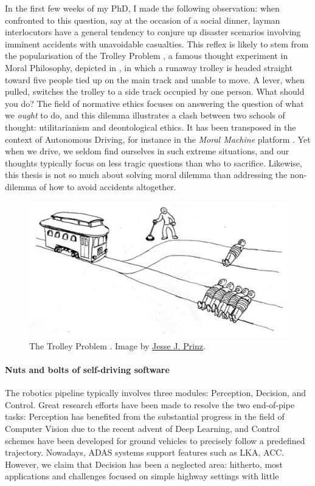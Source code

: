 In the first few weeks of my PhD, I made the following observation: when confronted to this question, say at the occasion of a social dinner, layman interlocutors have a general tendency to conjure up disaster scenarios involving imminent accidents with unavoidable casualties. 
This reflex is likely to stem from the popularisation of the Trolley Problem \citep{Foot1967}, a famous thought experiment in Moral Philosophy, depicted in , in which a runaway trolley is headed straight toward five people tied up on the main track and unable to move. A lever, when pulled, switches the trolley to a side track occupied by one person. What should you do? The field of normative ethics focuses on answering the question of what we \emph{ought} to do, and this dilemma illustrates a clash between two schools of thought: utilitarianism and deontological ethics. 
It has been transposed in the context of Autonomous Driving, for instance in the \emph{Moral Machine} platform \citep{Awad2018}.
Yet when we drive, we seldom find ourselves in such extreme situations, and our thoughts typically focus on less tragic questions than who to sacrifice.
Likewise, this thesis is not so much about solving moral dilemma than addressing the non-dilemma of how to avoid accidents altogether.%
\begin{figure}[tp]
	\centering
	\includegraphics[width=0.7\linewidth]{img/trolley}
	\caption{The Trolley Problem \citep{Foot1967}. Image by \href{http://subcortex.com/}{Jesse J. Prinz}.}
	\label{fig:trolley}
\end{figure}

\paragraph{Nuts and bolts of self-driving software}

The robotics pipeline typically involves three modules: Perception, Decision, and Control.
Great research efforts have been made to resolve the two end-of-pipe tasks: Perception has benefited from the substantial progress in the field of Computer Vision due to the recent advent of Deep Learning, and Control schemes have been developed for ground vehicles to precisely follow a predefined trajectory. Nowadays, ADAS systems support features such as LKA, ACC. However, we claim that Decision has been a neglected area: hitherto, most applications and challenges focused on simple highway settings with little 

